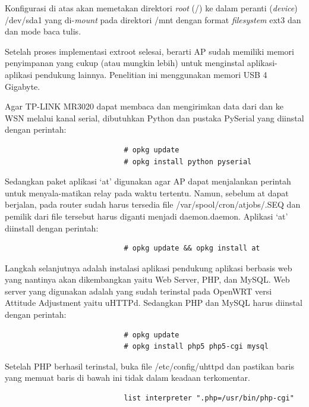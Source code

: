 \begin{enumerate}
					Konfigurasi di atas akan memetakan direktori \emph{root} (/) ke dalam peranti (\emph{device}) /dev/sda1 yang di-\emph{mount} pada direktori /mnt dengan format \emph{filesystem} ext3 dan dan mode baca tulis.

					Setelah proses implementasi extroot selesai, berarti AP sudah memiliki memori penyimpanan yang cukup (atau mungkin lebih) untuk menginstal aplikasi-aplikasi pendukung lainnya. Penelitian ini menggunakan memori USB 4 Gigabyte.

					Agar TP-LINK MR3020 dapat membaca dan mengirimkan data dari dan ke WSN melalui kanal serial, dibutuhkan Python dan pustaka PySerial yang diinstal dengan perintah:
					\begingroup
					    \fontsize{10pt}{12pt}\selectfont
					    \begin{verbatim}
							# opkg update
							# opkg install python pyserial
					    \end{verbatim}  
					\endgroup

					Sedangkan paket aplikasi `at' digunakan agar AP dapat menjalankan perintah untuk menyala-matikan relay pada waktu tertentu. Namun, sebelum at dapat berjalan, pada router sudah harus tersedia file /var/spool/cron/atjobs/.SEQ dan pemilik dari file tersebut harus diganti menjadi daemon.daemon. Aplikasi `at' diinstall dengan perintah:
					\begingroup
					    \fontsize{10pt}{12pt}\selectfont
					    \begin{verbatim}
							# opkg update && opkg install at
					    \end{verbatim}  
					\endgroup
					
					Langkah selanjutnya adalah instalasi aplikasi pendukung aplikasi berbasis web yang nantinya akan dikembangkan yaitu Web Server, PHP, dan MySQL. Web server yang digunakan adalah yang sudah terinstal pada OpenWRT versi Attitude Adjustment yaitu uHTTPd. Sedangkan PHP dan MySQL harus diinstal dengan perintah:
					\begingroup
					    \fontsize{10pt}{12pt}\selectfont
					    \begin{verbatim}
							# opkg update
							# opkg install php5 php5-cgi mysql
					    \end{verbatim}  
					\endgroup

					Setelah PHP berhasil terinstal, buka file /etc/config/uhttpd dan pastikan baris yang memuat baris di bawah ini tidak dalam keadaan terkomentar.

					\begingroup
					    \fontsize{10pt}{12pt}\selectfont
					    \centering
					    \begin{verbatim}
							list interpreter ".php=/usr/bin/php-cgi"
					    \end{verbatim}  
					\endgroup					


\end{enumerate}
